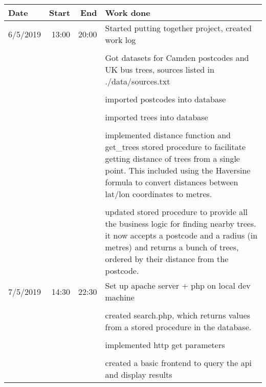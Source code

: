 \documentclass{article}
\begin{document}
\begin{table}[h!]
    \begin{tabular}{l|r|r|p{15cm}}  %
        \textbf{Date} & \textbf{Start} & \textbf{End} & \textbf{Work done} \\
        \hline
        6/5/2019    &   13:00   &   20:00   &   Started putting together project, created work log\\
        &   &   &   \\
        &   &                               &   Got datasets for Camden postcodes and UK bus trees, sources listed in ./data/sources.txt \\
        &   &   &   \\
        &   &                               &   imported postcodes into database \\
        &   &   &   \\
        &   &                               &   imported trees into database \\
        &   &   &   \\
        &   &                               &   implemented distance function and get\_trees stored procedure to facilitate getting distance of trees from a single point. This included using the Haversine formula to convert distances between lat/lon coordinates to metres.  \\
        &   &   &   \\
        &   &                               &   updated stored procedure to provide all the business logic for finding nearby trees. it now accepts a postcode and a radius (in metres) and returns a bunch of trees, ordered by their distance from the postcode. \\
        \hline
        7/5/2019    &   14:30   &   22:30   &   Set up apache server + php on local dev machine\\
        &   &   &   \\
        &   &                               &   created search.php, which returns values from a stored procedure in the database.\\
        &   &   &   \\
        &   &                               &   implemented http get parameters\\
        &   &   &   \\
        &   &                               &   created a basic frontend to query the api and display results\\

\end{tabular}
\end{table}
\end{document}
